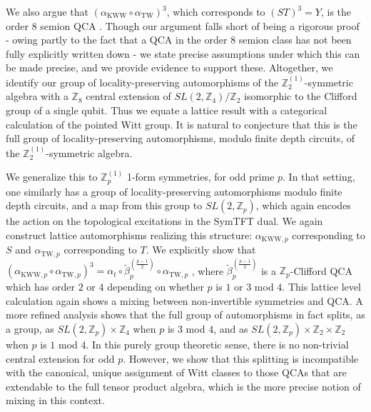 \documentclass[aps,twocolumn,prx,floatfix,preprintnumbers, nofootinbib,10pt]{revtex4-2}
\numberwithin{equation}{section}
\theoremstyle{definition}
\theoremstyle{remark}
\theoremstyle{claim}
\newcommand{\aKWW}{\alpha_\text{KWW}}
\newcommand{\aTW}{\alpha_\text{TW}}
\newcommand{\aKWWp}{\alpha_{\text{KWW},p}}
\newcommand{\aTWp}{\alpha_{\text{TW},p}}
\newcommand{\Z}{{\mathbb Z}}
\begin{document}
We also argue that $(\aKWW \circ \aTW)^3$, which corresponds to $(ST)^3 = Y$, is the order $8$ semion QCA \cite{Shirley_2022}. Though our argument falls short of being a rigorous proof - owing partly to the fact that a QCA in the order $8$ semion class has not been fully explicitly written down - we state precise assumptions under which this can be made precise, and we provide evidence to support these. Altogether, we identify our group of locality-preserving automorphisms of the $\Z_2^{(1)}$-symmetric algebra with a $\Z_8$ central extension of $SL(2,\Z_4)/\Z_2$ isomorphic to the Clifford group of a single qubit. Thus we equate a lattice result with a categorical calculation of the pointed Witt group. It is natural to conjecture that this is the full group of locality-preserving automorphisms, modulo finite depth circuits, of the $\Z_2^{(1)}$-symmetric algebra.

\noindent{\bf QCAs in 3+1d with $\Z_p^{(1)}$ 1-form Symmetry.}
We generalize this to $\Z_p^{(1)}$ 1-form symmetries, for odd prime $p$.  In that setting, one similarly has a group of locality-preserving automorphisms modulo finite depth circuits, and a map from this group to $SL(2,\Z_p)$, which again encodes the action on the topological excitations in the SymTFT dual.  We again construct lattice automorphisms realizing this structure: $\aKWWp$ corresponding to $S$ and $\aTWp$ corresponding to $T$.  We explicitly show that $(\aKWWp \circ \aTWp)^3 = \alpha_t \circ \tilde{\beta}^{(\frac{p-1}{2})}_p \circ \aTWp$ 
, where $\tilde{\beta}^{(\frac{p-1}{2})}_p$ is a $\Z_p$-Clifford QCA \cite{Haah_2021, MengSun2026} which has order $2$ or $4$ depending on whether $p$ is $1$ or $3$ mod $4$.  This lattice level calculation again shows a mixing between non-invertible symmetries and QCA.  A more refined analysis shows that the full group of automorphisms in fact splits, as a group, as $SL(2,\Z_p) \times \Z_4$ when $p$ is $3$ mod $4$, and as $SL(2,\Z_p) \times \Z_2 \times \Z_2$ when $p$ is $1$ mod $4$.  In this purely group theoretic sense, there is no non-trivial central extension for odd $p$.  
However, we {show} that this splitting is incompatible with the canonical, unique assignment of Witt classes to those QCAs that are extendable to the full tensor product algebra, which is the more precise notion of mixing in this context.
\end{document}
